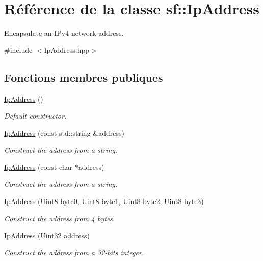 \hypertarget{classsf_1_1IpAddress}{}\section{Référence de la classe sf\+:\+:Ip\+Address}
\label{classsf_1_1IpAddress}


Encapsulate an I\+Pv4 network address.  




{\ttfamily \#include $<$Ip\+Address.\+hpp$>$}

\subsection*{Fonctions membres publiques}
\begin{DoxyCompactItemize}
\item 
\hyperlink{classsf_1_1IpAddress_af32a0574baa0f46e48deb2d83ca7658b}{Ip\+Address} ()
\begin{DoxyCompactList}\small\item\em Default constructor. \end{DoxyCompactList}\item 
\hyperlink{classsf_1_1IpAddress_a656b7445ab04cabaa7398685bc09c3f7}{Ip\+Address} (const std\+::string \&address)
\begin{DoxyCompactList}\small\item\em Construct the address from a string. \end{DoxyCompactList}\item 
\hyperlink{classsf_1_1IpAddress_a92f2a9be74334a61b96c2fc79fe6eb78}{Ip\+Address} (const char $\ast$address)
\begin{DoxyCompactList}\small\item\em Construct the address from a string. \end{DoxyCompactList}\item 
\hyperlink{classsf_1_1IpAddress_a1d289dcb9ce7a64c600c6f84cba88cc6}{Ip\+Address} (Uint8 byte0, Uint8 byte1, Uint8 byte2, Uint8 byte3)
\begin{DoxyCompactList}\small\item\em Construct the address from 4 bytes. \end{DoxyCompactList}\item 
\hyperlink{classsf_1_1IpAddress_a8ed34ba3a40d70eb9f09ac5ae779a162}{Ip\+Address} (Uint32 address)
\begin{DoxyCompactList}\small\item\em Construct the address from a 32-\/bits integer. \end{DoxyCompactList}\item 

\end{DoxyCompactItemize}
